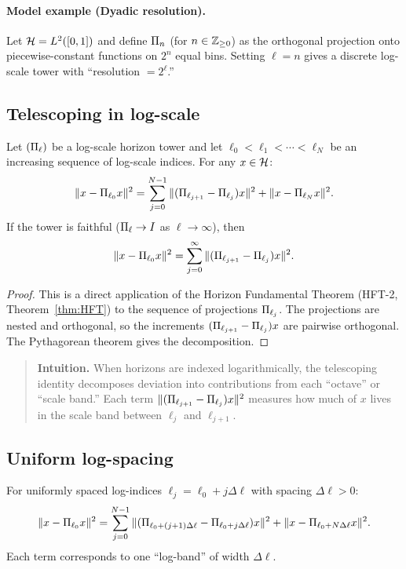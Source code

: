 \paragraph{Model example (Dyadic resolution).}
\label{ex:dyadic}
Let $\mathcal{H} = L^2([0,1])$ and define $\Pi_{n}$ (for $n \in \mathbb{Z}_{\ge 0}$) as the orthogonal projection onto piecewise-constant functions on $2^n$ equal bins.
Setting $\ell = n$ gives a discrete log-scale tower with ``resolution $= 2^\ell$.''

\subsection{Telescoping in log-scale}

\begin{theorem}
\label{thm:log-telescoping}
Let $(\Pi_{\ell})$ be a log-scale horizon tower and let $\ell_0 < \ell_1 < \cdots < \ell_N$ be an increasing sequence of log-scale indices.
For any $x \in \mathcal{H}$:
\[
\|x - \Pi_{\ell_0} x\|^2
=
\sum_{j=0}^{N-1} \|(\Pi_{\ell_{j+1}} - \Pi_{\ell_j}) x\|^2 + \|x - \Pi_{\ell_N} x\|^2.
\]
If the tower is faithful ($\Pi_{\ell} \to I$ as $\ell \to \infty$), then
\[
\|x - \Pi_{\ell_0} x\|^2 = \sum_{j=0}^{\infty} \|(\Pi_{\ell_{j+1}} - \Pi_{\ell_j}) x\|^2.
\]
\end{theorem}

\begin{proof}
This is a direct application of the Horizon Fundamental Theorem (HFT-2, Theorem~\ref{thm:HFT}) to the sequence of projections $\Pi_{\ell_j}$.
The projections are nested and orthogonal, so the increments $(\Pi_{\ell_{j+1}} - \Pi_{\ell_j}) x$ are pairwise orthogonal.
The Pythagorean theorem gives the decomposition.
\end{proof}

\begin{quote}\small
\textbf{Intuition.}
When horizons are indexed logarithmically, the telescoping identity decomposes deviation into contributions from each ``octave'' or ``scale band.''
Each term $\|(\Pi_{\ell_{j+1}} - \Pi_{\ell_j}) x\|^2$ measures how much of $x$ lives in the scale band between $\ell_j$ and $\ell_{j+1}$.
\end{quote}

\subsection{Uniform log-spacing}

\begin{corollary}
\label{cor:dyadic-telescoping}
For uniformly spaced log-indices $\ell_j = \ell_0 + j \Delta\ell$ with spacing $\Delta\ell > 0$:
\[
\|x - \Pi_{\ell_0} x\|^2 = \sum_{j=0}^{N-1} \|(\Pi_{\ell_0 + (j+1)\Delta\ell} - \Pi_{\ell_0 + j\Delta\ell}) x\|^2 + \|x - \Pi_{\ell_0 + N\Delta\ell} x\|^2.
\]
Each term corresponds to one ``log-band'' of width $\Delta\ell$.
\end{corollary}

